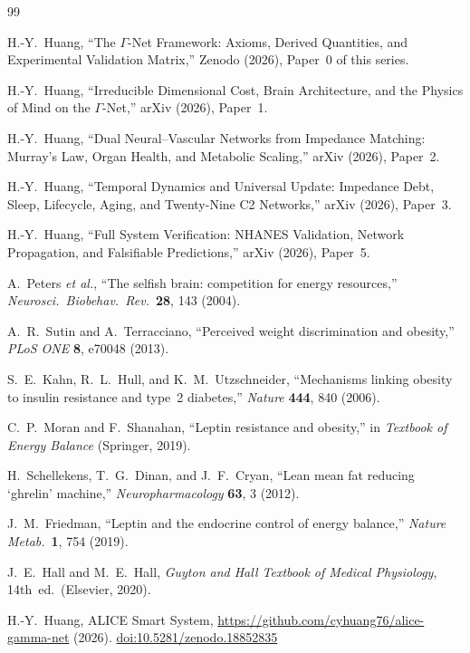 \documentclass[aps,pre,twocolumn,superscriptaddress,floatfix]{revtex4-2}
\begin{document}
\begin{thebibliography}{99}

H.-Y.~Huang, ``The $\Gamma$-Net Framework: Axioms,
Derived Quantities, and Experimental Validation
Matrix,'' Zenodo (2026), Paper~0 of this series.

H.-Y.~Huang, ``Irreducible Dimensional Cost, Brain
Architecture, and the Physics of Mind on the
$\Gamma$-Net,'' arXiv (2026), Paper~1.

H.-Y.~Huang, ``Dual Neural--Vascular Networks from
Impedance Matching: Murray's Law, Organ Health, and
Metabolic Scaling,'' arXiv (2026), Paper~2.

H.-Y.~Huang, ``Temporal Dynamics and Universal
Update: Impedance Debt, Sleep, Lifecycle, Aging,
and Twenty-Nine C2 Networks,''
arXiv (2026), Paper~3.

H.-Y.~Huang, ``Full System Verification: NHANES
Validation, Network Propagation, and Falsifiable
Predictions,'' arXiv (2026), Paper~5.

A.~Peters \emph{et al.}, ``The selfish brain:
competition for energy resources,''
\emph{Neurosci.\ Biobehav.\ Rev.}\
\textbf{28}, 143 (2004).

A.~R.~Sutin and A.~Terracciano,
``Perceived weight discrimination and obesity,''
\emph{PLoS ONE} \textbf{8}, e70048 (2013).

S.~E.~Kahn, R.~L.~Hull, and K.~M.~Utzschneider,
``Mechanisms linking obesity to insulin resistance
and type~2 diabetes,''
\emph{Nature} \textbf{444}, 840 (2006).

C.~P.~Moran and F.~Shanahan,
``Leptin resistance and obesity,''
in \emph{Textbook of Energy Balance} (Springer, 2019).

H.~Schellekens, T.~G.~Dinan, and J.~F.~Cryan,
``Lean mean fat reducing `ghrelin' machine,''
\emph{Neuropharmacology} \textbf{63}, 3 (2012).

J.~M.~Friedman, ``Leptin and the endocrine control of
energy balance,''
\emph{Nature Metab.}\ \textbf{1}, 754 (2019).

J.~E.~Hall and M.~E.~Hall, \emph{Guyton and Hall
Textbook of Medical Physiology}, 14th~ed.\
(Elsevier, 2020).

H.-Y.~Huang, ALICE Smart System,
\url{https://github.com/cyhuang76/alice-gamma-net}
(2026).
\href{https://doi.org/10.5281/zenodo.18852835}{%
doi:10.5281/zenodo.18852835}

\end{thebibliography}
\end{document}
